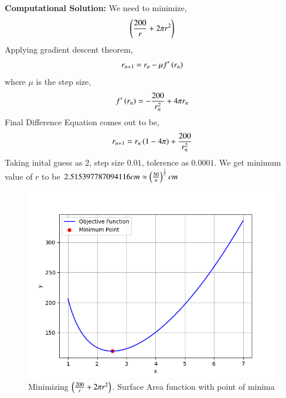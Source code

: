 \documentclass[journal]{IEEEtran}
\begin{document}
\textbf{Computational Solution:}\newline
We need to minimize,
\begin{align}
  \left(\frac{200}{r} + 2\pi r^2\right)
\end{align}
Applying gradient descent theorem,
\begin{align}
  r_{n+1} = r_n -\mu f^{\prime}\left(r_n\right)\\
\end{align}
where $\mu$ is the step size,
\begin{align}
  f^{\prime}\left(r_n\right) = -\frac{200}{r_n^2} +4\pi r_n
\end{align}
Final Difference Equation comes out to be, 
\begin{align}
  r_{n+1} = r_n\left(1 - 4\pi\right) + \frac{200}{r_n^2} 
\end{align}
Taking inital guess as $2$, step size $0.01$, tolerence as $0.0001$. 
We get minimum value of $r$ to be $2.515397787094116 cm \approx \left(\frac{50}{\pi}\right)^{\frac{1}{3}} cm$


\begin{figure}[h!]
   \centering
   \includegraphics[width=1\columnwidth]{figs/fig.png}
   \caption{Minimizing $\left(\frac{200}{r} + 2\pi r^2\right)$. Surface Area function with point of minima}
   \label{stemplot}
\end{figure}
\end{document}
